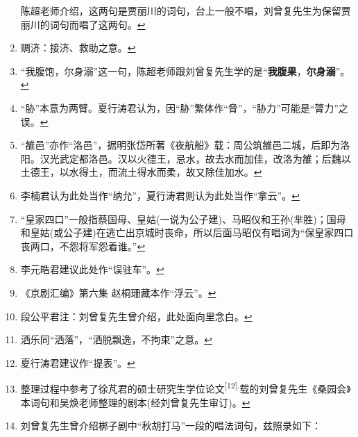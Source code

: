\begin{enumerate}
  陈超老师介绍，这两句是贾丽川的词句，台上一般不唱，刘曾复先生为保留贾丽川的词句而唱了这两句。\protect\hyperlink{fnref72}{↩}
\item
  \leavevmode\hypertarget{fn73}{}%
  赒济：接济、救助之意。\protect\hyperlink{fnref73}{↩}
\item
  \leavevmode\hypertarget{fn74}{}%
  ``我腹饱，尔身溺''这一句，陈超老师跟刘曾复先生学的是``\textbf{我腹果}，\textbf{尔身溺}''。\protect\hyperlink{fnref74}{↩}
\item
  \leavevmode\hypertarget{fn75}{}%
  ``胁''本意为两臂。夏行涛君认为，因``胁''繁体作``脅''，``胁力''可能是``膂力''之误。\protect\hyperlink{fnref75}{↩}
\item
  \leavevmode\hypertarget{fn76}{}%
  ``雒邑''亦作``洛邑''，据明张岱所著《夜航船》载：周公筑雒邑二城，后即为洛阳。汉光武定都洛邑。汉以火德王，忌水，故去水而加佳，改洛为雒；后魏以土德王，以水得土，而流土得水而柔，故又除佳加水。\protect\hyperlink{fnref76}{↩}
\item
  \leavevmode\hypertarget{fn77}{}%
  李楠君认为此处当作``纳允''，夏行涛君则认为此处当作``拿云''。\protect\hyperlink{fnref77}{↩}
\item
  \leavevmode\hypertarget{fn78}{}%
  ``皇家四口''一般指蔡国母、皇姑(一说为公子建)、马昭仪和王孙(芈胜)；国母和皇姑(或公子建)在逃亡出京城时丧命，所以后面马昭仪有唱词为``保皇家四口丧两口，不怨将军怨着谁。''\protect\hyperlink{fnref78}{↩}
\item
  \leavevmode\hypertarget{fn79}{}%
  李元皓君建议此处作``误驻车''。\protect\hyperlink{fnref79}{↩}
\item
  \leavevmode\hypertarget{fn80}{}%
  《京剧汇编》第六集
  赵桐珊藏本作``浮云''。\protect\hyperlink{fnref80}{↩}
\item
  \leavevmode\hypertarget{fn81}{}%
  段公平君注：刘曾复先生曾介绍，此处面向里念白。\protect\hyperlink{fnref81}{↩}
\item
  \leavevmode\hypertarget{fn82}{}%
  洒乐同``洒落''，``洒脱飘逸，不拘束''之意。\protect\hyperlink{fnref82}{↩}
\item
  \leavevmode\hypertarget{fn83}{}%
  夏行涛君建议作``提表''。\protect\hyperlink{fnref83}{↩}
\item
  \leavevmode\hypertarget{fn84}{}%
  整理过程中参考了徐芃君的硕士研究生学位论文\textsuperscript{{[}12{]}.}载的刘曾复先生《桑园会》本词句和吴焕老师整理的剧本(经刘曾复先生审订)。\protect\hyperlink{fnref84}{↩}
\item
  \leavevmode\hypertarget{fn85}{}%
  刘曾复先生曾介绍梆子剧中``秋胡打马''一段的唱法词句，兹照录如下：


\end{enumerate}
